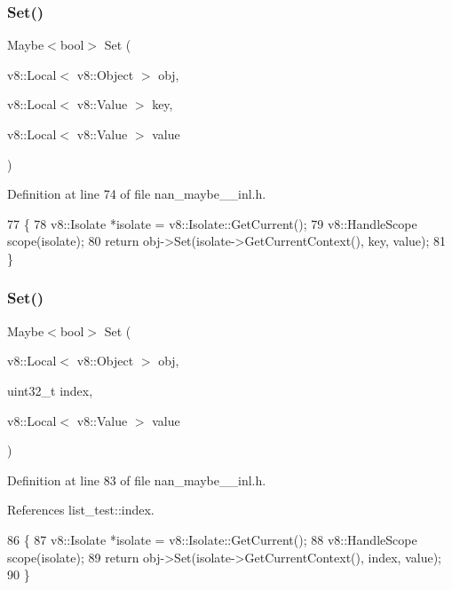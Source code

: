 \subsubsection{Set()\hspace{0.1cm}{\footnotesize\ttfamily [1/2]}}
{\footnotesize\ttfamily Maybe$<$bool$>$ Set (\begin{DoxyParamCaption}\item[{v8\+::\+Local$<$ v8\+::\+Object $>$}]{obj,  }\item[{v8\+::\+Local$<$ v8\+::\+Value $>$}]{key,  }\item[{v8\+::\+Local$<$ v8\+::\+Value $>$}]{value }\end{DoxyParamCaption})}



Definition at line 74 of file nan\+\_\+maybe\+\_\+\_\+inl.\+h.


\begin{DoxyCode}
77                             \{
78   v8::Isolate *isolate = v8::Isolate::GetCurrent();
79   v8::HandleScope scope(isolate);
80   \textcolor{keywordflow}{return} obj->Set(isolate->GetCurrentContext(), key, value);
81 \}
\end{DoxyCode}
\mbox{\label{nan__maybe__43__inl_8h_a303a30c7af19da038d65d92190b2a6d3}} 
\subsubsection{Set()\hspace{0.1cm}{\footnotesize\ttfamily [2/2]}}
{\footnotesize\ttfamily Maybe$<$bool$>$ Set (\begin{DoxyParamCaption}\item[{v8\+::\+Local$<$ v8\+::\+Object $>$}]{obj,  }\item[{uint32\+\_\+t}]{index,  }\item[{v8\+::\+Local$<$ v8\+::\+Value $>$}]{value }\end{DoxyParamCaption})}



Definition at line 83 of file nan\+\_\+maybe\+\_\+\_\+inl.\+h.



References list\+\_\+test\+::index.


\begin{DoxyCode}
86                             \{
87   v8::Isolate *isolate = v8::Isolate::GetCurrent();
88   v8::HandleScope scope(isolate);
89   \textcolor{keywordflow}{return} obj->Set(isolate->GetCurrentContext(), index, value);
90 \}
\end{DoxyCode}
\mbox{\label{nan__maybe__43__inl_8h_a93d8d6f8f7d24c3f484a98ec57f4a4b0}} 
